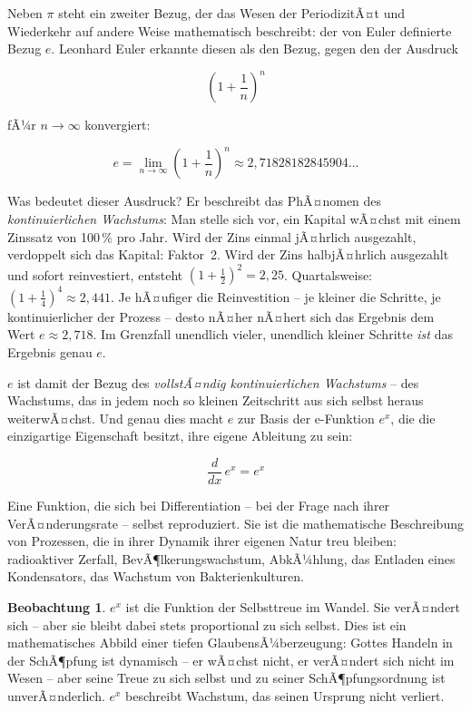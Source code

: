 ﻿\documentclass[a4paper,12pt]{article}
\theoremstyle{definition}
\newtheorem{observation}{Beobachtung}[section]
\begin{document}
Neben $\pi$ steht ein zweiter Bezug, der das Wesen der PeriodizitÃ¤t
und Wiederkehr auf andere Weise mathematisch beschreibt: der von Euler definierte Bezug $e$.
Leonhard Euler erkannte diesen als den Bezug, gegen den der Ausdruck

\begin{equation}
	\left(1 + \frac{1}{n}\right)^n
\end{equation}

fÃ¼r $n \to \infty$ konvergiert:

\begin{equation}
	e = \lim_{n \to \infty} \left(1 + \frac{1}{n}\right)^n \approx
	2{,}71828182845904\ldots
\end{equation}

Was bedeutet dieser Ausdruck? Er beschreibt das PhÃ¤nomen des \textit{kontinuierlichen
	Wachstums}: Man stelle sich vor, ein Kapital wÃ¤chst mit einem Zinssatz von 100\,\%
pro Jahr. Wird der Zins einmal jÃ¤hrlich ausgezahlt, verdoppelt sich das Kapital:
Faktor~2. Wird der Zins halbjÃ¤hrlich ausgezahlt und sofort reinvestiert, entsteht
$\left(1{+}\tfrac{1}{2}\right)^2 = 2{,}25$. Quartalsweise: $\left(1{+}
\tfrac{1}{4}\right)^4 \approx 2{,}441$. Je hÃ¤ufiger die Reinvestition --
je kleiner die Schritte, je kontinuierlicher der Prozess -- desto nÃ¤her nÃ¤hert
sich das Ergebnis dem Wert $e \approx 2{,}718$. Im Grenzfall unendlich vieler,
unendlich kleiner Schritte \textit{ist} das Ergebnis genau $e$.

$e$ ist damit der Bezug des \textit{vollstÃ¤ndig kontinuierlichen Wachstums} --
des Wachstums, das in jedem noch so kleinen Zeitschritt aus sich selbst heraus
weiter\-wÃ¤chst. Und genau dies macht $e$ zur Basis der e-Funktion $e^x$, die die einzigartige Eigenschaft besitzt, ihre eigene Ableitung zu sein:

\begin{equation}
	\frac{d}{dx}\, e^x = e^x
\end{equation}

Eine Funktion, die sich bei Differentiation -- bei der Frage nach ihrer
VerÃ¤nderungsrate -- selbst reproduziert. Sie ist die mathematische Beschreibung
von Prozessen, die in ihrer Dynamik ihrer eigenen Natur treu bleiben: radioaktiver
Zerfall, BevÃ¶lkerungswachstum, AbkÃ¼hlung, das Entladen eines Kondensators,
das Wachstum von Bakterienkulturen.

\begin{observation}
	$e^{x}$ ist die Funktion der Selbsttreue im Wandel. Sie verÃ¤ndert sich --
	aber sie bleibt dabei stets proportional zu sich selbst. Dies ist ein mathematisches
	Abbild einer tiefen GlaubensÃ¼berzeugung: Gottes Handeln in der SchÃ¶pfung
	ist dynamisch -- er wÃ¤chst nicht, er verÃ¤ndert sich nicht im Wesen -- aber
	seine Treue zu sich selbst und zu seiner SchÃ¶pfungsordnung ist unverÃ¤nderlich.
	$e^{x}$ beschreibt Wachstum, das seinen Ursprung nicht verliert.
\end{observation}
\end{document}
